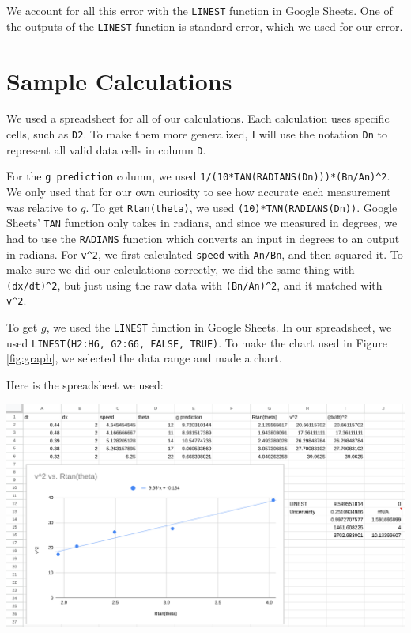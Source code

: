 \documentclass[12pt]{article}
\begin{document}
We account for all this error with the \texttt{LINEST} function in Google Sheets. One of the outputs of the \texttt{LINEST} function is standard error, which we used for our error.
\section{Sample Calculations}
\label{sec:org740433d}

We used a spreadsheet for all of our calculations. Each calculation uses specific cells, such as \texttt{D2}. To make them more generalized, I will use the notation \texttt{Dn} to represent all valid data cells in column \texttt{D}.

For the \texttt{g prediction} column, we used \texttt{1/(10*TAN(RADIANS(Dn)))*(Bn/An)\textasciicircum{}2}. We only used that for our own curiosity to see how accurate each measurement was relative to \(g\). To get \texttt{Rtan(theta)}, we used \texttt{(10)*TAN(RADIANS(Dn))}. Google Sheets' \texttt{TAN} function only takes in radians, and since we measured in degrees, we had to use the \texttt{RADIANS} function which converts an input in degrees to an output in radians. For \texttt{v\textasciicircum{}2}, we first calculated \texttt{speed} with \texttt{An/Bn}, and then squared it. To make sure we did our calculations correctly, we did the same thing with \texttt{(dx/dt)\textasciicircum{}2}, but just using the raw data with \texttt{(Bn/An)\textasciicircum{}2}, and it matched with \texttt{v\textasciicircum{}2}.

To get \(g\), we used the \texttt{LINEST} function in Google Sheets. In our spreadsheet, we used \texttt{LINEST(H2:H6, G2:G6, FALSE, TRUE)}. To make the chart used in Figure \ref{fig:graph}, we selected the data range and made a chart.

Here is the spreadsheet we used:

\begin{center}
\includegraphics[width=6.5in]{./spreadsheet.png}
\end{center}
\end{document}
